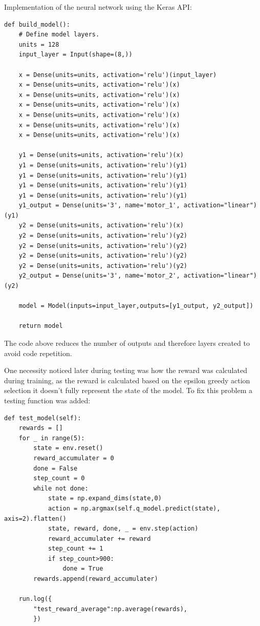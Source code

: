 Implementation of the neural network using the Keras API:
\begin{lstlisting}
def build_model():
    # Define model layers.
    units = 128
    input_layer = Input(shape=(8,))

    x = Dense(units=units, activation='relu')(input_layer)
    x = Dense(units=units, activation='relu')(x)
    x = Dense(units=units, activation='relu')(x)
    x = Dense(units=units, activation='relu')(x)
    x = Dense(units=units, activation='relu')(x)
    x = Dense(units=units, activation='relu')(x)
    x = Dense(units=units, activation='relu')(x)

    y1 = Dense(units=units, activation='relu')(x)
    y1 = Dense(units=units, activation='relu')(y1)
    y1 = Dense(units=units, activation='relu')(y1)
    y1 = Dense(units=units, activation='relu')(y1)
    y1 = Dense(units=units, activation='relu')(y1)
    y1_output = Dense(units='3', name='motor_1', activation="linear")(y1)
    y2 = Dense(units=units, activation='relu')(x)
    y2 = Dense(units=units, activation='relu')(y2)
    y2 = Dense(units=units, activation='relu')(y2)
    y2 = Dense(units=units, activation='relu')(y2)
    y2 = Dense(units=units, activation='relu')(y2)
    y2_output = Dense(units='3', name='motor_2', activation="linear")(y2)

    model = Model(inputs=input_layer,outputs=[y1_output, y2_output])

    return model

\end{lstlisting}

The code above reduces the number of outputs and therefore layers created to avoid code repetition.

One necessity noticed later during testing was how the reward was calculated during training, as the reward is calculated based on the epsilon greedy action selection it doesn't fully represent the state of the model. To fix this problem a testing function was added:
\begin{lstlisting}
def test_model(self):  
    rewards = []
    for _ in range(5):
        state = env.reset()
        reward_accumulater = 0
        done = False
        step_count = 0
        while not done:
            state = np.expand_dims(state,0)
            action = np.argmax(self.q_model.predict(state), axis=2).flatten()
            state, reward, done, _ = env.step(action)
            reward_accumulater += reward
            step_count += 1
            if step_count>900:
                done = True
        rewards.append(reward_accumulater)
            
    run.log({
        "test_reward_average":np.average(rewards),
        })
\end{lstlisting}

